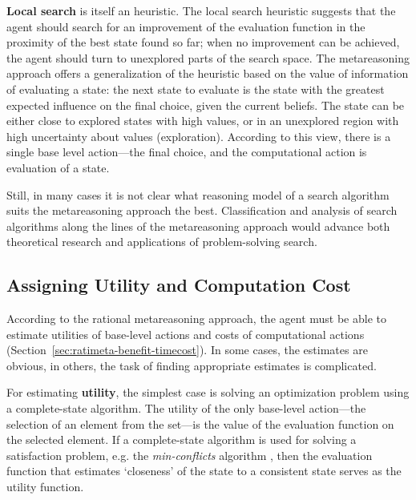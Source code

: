 {\bf Local search} is itself an heuristic. The local search heuristic
suggests that the agent should search for an improvement of the
evaluation function in the proximity of the best state found so far;
when no improvement can be achieved, the agent should turn to
unexplored parts of the search space. The metareasoning approach
offers a generalization of the heuristic based on the value of
information of evaluating a state: the next state to evaluate is the
state with the greatest expected influence on the final choice, given
the current beliefs. The state can be either close to explored
states with high values, or in an unexplored region with high
uncertainty about values (exploration). According to this view, there
is a single base level action---the final choice, and the computational
action is evaluation of a state.

Still, in many cases it is not clear what reasoning model of a search
algorithm suits the metareasoning approach the best. Classification
and analysis of search algorithms along the lines of the metareasoning
approach would advance both theoretical research and applications of
problem-solving search.

\subsection{Assigning Utility and Computation Cost}

According to the rational metareasoning approach, the agent must be
able to estimate utilities of base-level actions and costs of
computational actions
(Section~\ref{sec:ratimeta-benefit-timecost}). In some cases, the
estimates are obvious, in others, the task of finding appropriate
estimates is complicated.

For estimating {\bf utility}, the simplest case is solving an
optimization problem using a complete-state algorithm. The utility of
the only base-level action---the selection of an element from the
set---is the value of the evaluation function on the selected
element. If a complete-state algorithm is used for solving a
satisfaction problem, e.g. the {\em min-conflicts} algorithm
\cite{Russell.aima}, then the evaluation function that estimates
`closeness' of the state to a consistent state serves as the utility
function.

